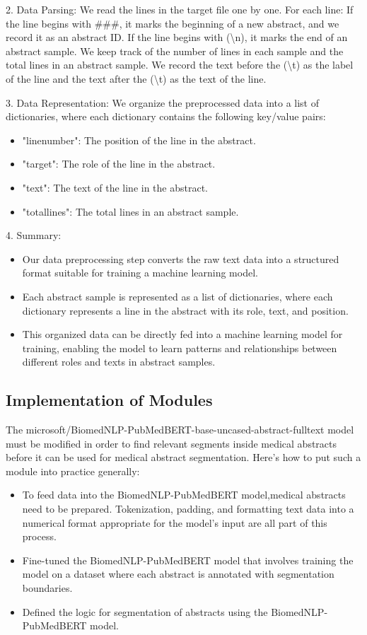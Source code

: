 \documentclass[12pt,a4paper]{report}     %
\begin{document}
\begin{normalsize}
{{2. Data Parsing:
We read the lines in the target file one by one.
For each line:
If the line begins with \#\#\#, it marks the beginning of a new abstract, and we record it as an abstract ID.
If the line begins with (\textbackslash n), it marks the end of an abstract sample.
We keep track of the number of lines in each sample and the total lines in an abstract sample.
We record the text before the (\textbackslash t) as the label of the line and the text after the (\textbackslash t) as the text of the line.

3. Data Representation:
We organize the preprocessed data into a list of dictionaries, where each dictionary contains the following key/value pairs:
\begin{itemize}
\item  "line\textunderscore number": The position of the line in the abstract.
\item  "target": The role of the line in the abstract.
\item  "text": The text of the line in the abstract.
\item  "total\textunderscore lines": The total lines in an abstract sample.
\end{itemize}
4. Summary:
\begin{itemize}
    \item Our data preprocessing step converts the raw text data into a 
          structured format suitable for training a machine learning model.
    \item Each abstract sample is represented as a list of dictionaries, 
          where each dictionary represents a line in the abstract with its role, text, and position.
    \item This organized data can be directly fed into a machine learning 
          model for training, enabling the model to learn patterns and relationships between different roles and texts in abstract samples. 
\end{itemize}


\subsection{Implementation of Modules}
The microsoft/BiomedNLP-PubMedBERT-base-uncased-abstract-fulltext model must be modified in order to find relevant segments inside medical abstracts before it can be used for medical abstract segmentation. Here's how to put such a module into practice generally:
\begin{itemize}
    \item To feed data into the BiomedNLP-PubMedBERT model,medical abstracts need to be prepared. Tokenization, padding, and formatting text data into a numerical format appropriate for the model's input are all part of this process.
    \item Fine-tuned the BiomedNLP-PubMedBERT model that involves training the model on a dataset where each abstract is annotated with segmentation boundaries.
    \item Defined the logic for segmentation of abstracts using the BiomedNLP-PubMedBERT model. 


\end{itemize}}}
\end{normalsize}
\end{document}
